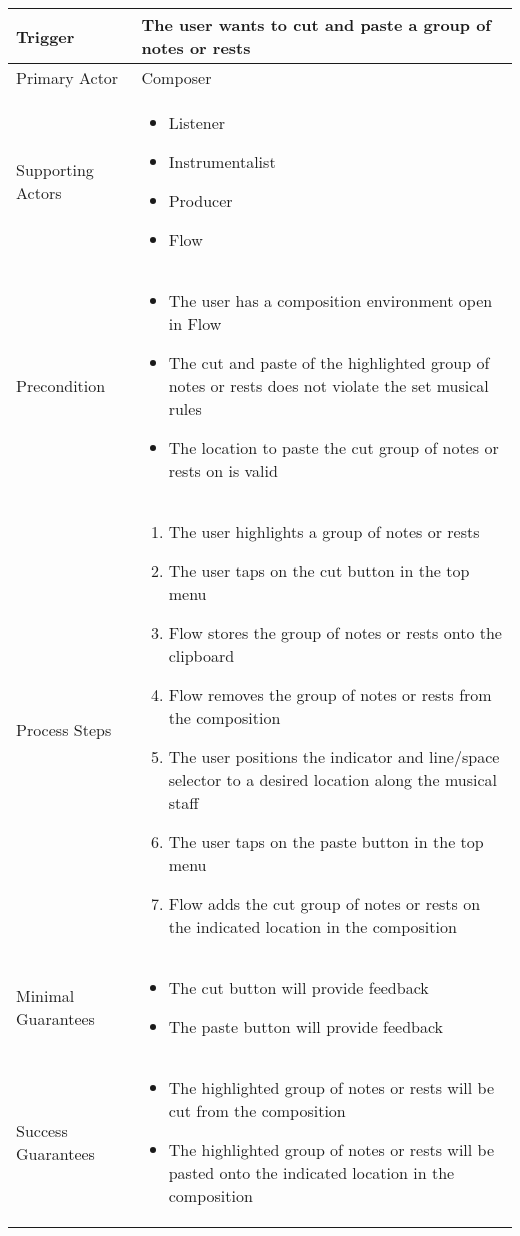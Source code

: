 \begin{longtable}{|X|X|}
\hline
Trigger & 
The user wants to cut and paste a group of notes or rests\\
\hline
Primary Actor & 
Composer \\
\hline
Supporting Actors & 
\begin{itemize}
\item Listener
\item Instrumentalist
\item Producer
\item Flow
\end{itemize} \\
\hline
Precondition & 
\begin{itemize}
\item The user has a composition environment open in Flow
\item The cut and paste of the highlighted group of notes or rests does not violate the set musical rules
\item The location to paste the cut group of notes or rests on is valid
\end{itemize} \\
\hline
Process Steps & 
\begin{enumerate}
\item The user highlights a group of notes or rests
\item The user taps on the cut button in the top menu
\item Flow stores the group of notes or rests onto the clipboard
\item Flow removes the group of notes or rests from the composition
\item The user positions the indicator and line/space selector to a desired location along the musical staff
\item The user taps on the paste button in the top menu
\item Flow adds the cut group of notes or rests on the indicated location in the composition
\end{enumerate} \\
\hline
Minimal Guarantees & 
\begin{itemize}
  \item The cut button will provide feedback
  \item The paste button will provide feedback
\end{itemize} \\
\hline
Success Guarantees & 
\begin{itemize}
  \item The highlighted group of notes or rests will be cut from the composition
  \item The highlighted group of notes or rests will be pasted onto the indicated location in the composition
\end{itemize} \\
\hline
\end{longtable}